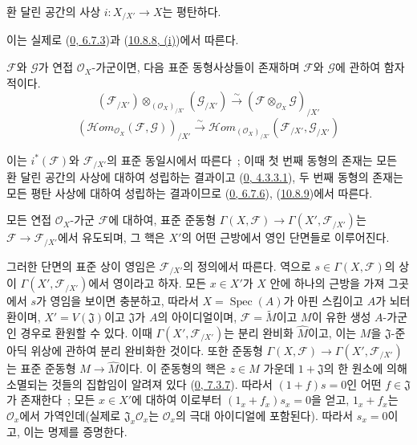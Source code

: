 \begin{corollary}[10.8.9]
\label{I.10.8.9-ko}
환 달린 공간의 사상 $i:X_{/X'}\to X$는 평탄하다.
\end{corollary}

이는 실제로 (\hyperref[0.6.7.3-ko]{0, 6.7.3})과
(\hyperref[I.10.8.8-ko]{10.8.8, (i)})에서 따른다.

\begin{corollary}[10.8.10]
\label{I.10.8.10-ko}
$\mathscr{F}$와 $\mathscr{G}$가 연접 $\mathscr{O}_X$-가군이면, 다음
표준 동형사상들이 존재하며 $\mathscr{F}$와 $\mathscr{G}$에 관하여 함자적이다.
\[
  (\mathscr{F}_{/X'})\otimes_{(\mathscr{O}_X)_{/X'}}
  (\mathscr{G}_{/X'})
  \xrightarrow{\sim}
  (\mathscr{F}\otimes_{\mathscr{O}_X}\mathscr{G})_{/X'}
  \tag{10.8.10.1}\label{I.10.8.10.1-ko}
\]
\[
  (\mathscr{H}\!om_{\mathscr{O}_X}(\mathscr{F},\mathscr{G}))_{/X'}
  \xrightarrow{\sim}
  \mathscr{H}\!om_{(\mathscr{O}_X)_{/X'}}
  (\mathscr{F}_{/X'},\mathscr{G}_{/X'})
  \tag{10.8.10.2}\label{I.10.8.10.2-ko}
\]
\end{corollary}

이는 $i^*(\mathscr{F})$와 $\mathscr{F}_{/X'}$의 표준 동일시에서 따른다~;
이때 첫 번째 동형의 존재는 모든 환 달린 공간의 사상에 대하여 성립하는
결과이고 (\hyperref[0.4.3.3.1-ko]{0, 4.3.3.1}), 두 번째 동형의 존재는
모든 평탄 사상에 대하여 성립하는 결과이므로
(\hyperref[0.6.7.6-ko]{0, 6.7.6}),
(\hyperref[I.10.8.9-ko]{10.8.9})에서 따른다.

\begin{proposition}[10.8.11]
\label{I.10.8.11-ko}
모든 연접 $\mathscr{O}_X$-가군 $\mathscr{F}$에 대하여, 표준 준동형
$\Gamma(X,\mathscr{F})\to\Gamma(X',\mathscr{F}_{/X'})$는
$\mathscr{F}\to\mathscr{F}_{/X'}$에서 유도되며, 그 핵은 $X'$의 어떤
근방에서 영인 단면들로 이루어진다.
\end{proposition}

그러한 단면의 표준 상이 영임은 $\mathscr{F}_{/X'}$의 정의에서 따른다.
역으로 $s\in\Gamma(X,\mathscr{F})$의 상이
$\Gamma(X',\mathscr{F}_{/X'})$에서 영이라고 하자. 모든 $x\in X'$가
$X$ 안에 하나의 근방을 가져 그곳에서 $s$가 영임을 보이면 충분하고, 따라서
$X=\operatorname{Spec}(A)$가 아핀 스킴이고 $A$가 뇌터 환이며,
$X'=V(\mathfrak{J})$이고 $\mathfrak{J}$가 $A$의 아이디얼이며,
$\mathscr{F}=\widetilde M$이고 $M$이 유한 생성 $A$-가군인 경우로
환원할 수 있다. 이때 $\Gamma(X',\mathscr{F}_{/X'})$는
분리 완비화 $\widehat M$이고, 이는 $M$을 $\mathfrak{J}$-준아딕 위상에
관하여 분리 완비화한 것이다. 또한
준동형 $\Gamma(X,\mathscr{F})\to\Gamma(X',\mathscr{F}_{/X'})$는
표준 준동형 $M\to\widehat M$이다. 이 준동형의 핵은
$z\in M$ 가운데 $1+\mathfrak{J}$의 한 원소에 의해 소멸되는 것들의 집합임이
알려져 있다 (\hyperref[0.7.3.7-ko]{0, 7.3.7}). 따라서
$(1+f)s=0$인 어떤 $f\in\mathfrak{J}$가 존재한다~; 모든 $x\in X'$에
대하여 이로부터 $(1_x+f_x)s_x=0$을 얻고,
$1_x+f_x$는 $\mathscr{O}_x$에서 가역인데(실제로
$\mathfrak{J}_x\mathscr{O}_x$는 $\mathscr{O}_x$의 극대 아이디얼에
포함된다). 따라서
$s_x=0$이고, 이는 명제를 증명한다.

